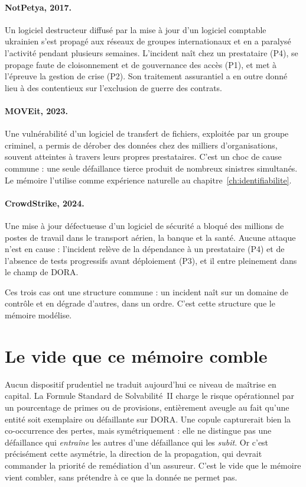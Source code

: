 \paragraph{NotPetya, 2017.} Un logiciel destructeur diffusé par la mise à jour d'un logiciel
comptable ukrainien s'est propagé aux réseaux de groupes internationaux et en a paralysé
l'activité pendant plusieurs semaines. L'incident naît chez un prestataire (P4), se propage faute
de cloisonnement et de gouvernance des accès (P1), et met à l'épreuve la gestion de crise (P2).
Son traitement assurantiel a en outre donné lieu à des contentieux sur l'exclusion de guerre des
contrats.

\paragraph{MOVEit, 2023.} Une vulnérabilité d'un logiciel de transfert de fichiers, exploitée par
un groupe criminel, a permis de dérober des données chez des milliers d'organisations, souvent
atteintes à travers leurs propres prestataires. C'est un choc de cause commune : une seule
défaillance tierce produit de nombreux sinistres simultanés. Le mémoire l'utilise comme
expérience naturelle au chapitre~\ref{ch:identifiabilite}.

\paragraph{CrowdStrike, 2024.} Une mise à jour défectueuse d'un logiciel de sécurité a bloqué des
millions de postes de travail dans le transport aérien, la banque et la santé. Aucune attaque
n'est en cause : l'incident relève de la dépendance à un prestataire (P4) et de l'absence de
tests progressifs avant déploiement (P3), et il entre pleinement dans le champ de DORA.

Ces trois cas ont une structure commune : un incident naît sur un domaine de contrôle et en
dégrade d'autres, dans un ordre. C'est cette structure que le mémoire modélise.

\section{Le vide que ce mémoire comble}
Aucun dispositif prudentiel ne traduit aujourd'hui ce niveau de maîtrise en capital. La
Formule Standard de Solvabilité~II charge le risque opérationnel par un pourcentage de primes
ou de provisions, entièrement aveugle au fait qu'une entité soit exemplaire ou
défaillante sur DORA. Une copule capturerait bien la co-occurrence des pertes, mais
symétriquement : elle ne distingue pas une défaillance qui \emph{entraîne} les autres d'une
défaillance qui les \emph{subit}. Or c'est précisément cette asymétrie, la direction de la
propagation, qui devrait commander la priorité de remédiation d'un assureur. C'est le vide
que le mémoire vient combler, sans prétendre à ce que la donnée ne permet pas.

